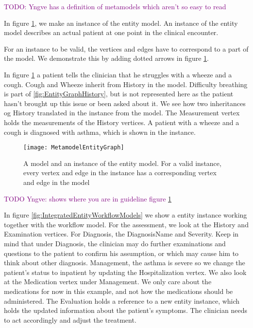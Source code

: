 \textcolor{purple}{TODO: Yngve has a definition of metamodels which aren't so easy to read}

In figure \ref{fig:MetamodelEntityGraph}, we make an instance of the entity model. An instance of the entity model describes an actual patient at one point in the clinical encounter. 

For an instance to be valid, the vertices and edges have to correspond to a part of the model. We demonstrate this by adding dotted arrows in figure \ref{fig:MetamodelEntityGraph}. 

In figure \ref{fig:MetamodelEntityGraph} a patient tells the clinician that he struggles with a wheeze and a cough. Cough and Wheeze inherit from History in the model. Difficulty breathing is part of \ref{fig:EntityGraphHistory}, but is not represented here as the patient hasn't brought up this issue or been asked about it. We see how two inheritances og History translated in the instance from the model. The Measurement vertex holds the measurements of the History vertices. A patient with a wheeze and a cough is diagnosed with asthma, which is shown in the instance.

\begin{figure}[h!]
	\texttt{[image: MetamodelEntityGraph]}
	\caption {A model and an instance of the entity model. For a valid instance, every vertex and edge in the instance has a corresponding vertex and edge in the model}
		\label{fig:MetamodelEntityGraph}
\end{figure}

\textcolor{purple}{TODO Yngve: shows where you are in guideline figure \ref{fig:MetamodelEntityGraph}}

In figure \ref{fig:IntegratedEntityWorkflowModels} we show a entity instance working together with the workflow model. For the assessment, we look at the History and Examination vertices. For Diagnosis, the DiagnosisName and Severity. Keep in mind that under Diagnosis, the clinician may do further examinations and questions to the patient to confirm his assumption, or which may cause him to think about other diagnosis. Management, the asthma is severe so we change the patient's status to inpatient by updating the Hospitalization vertex. We also look at the Medication vertex under Management. We only care about the medications for now in this example, and not how the medications should be administered. The Evaluation holds a reference to a new entity instance, which holds the updated information about the patient's symptoms. The clinician needs to act accordingly and adjust the treatment.

